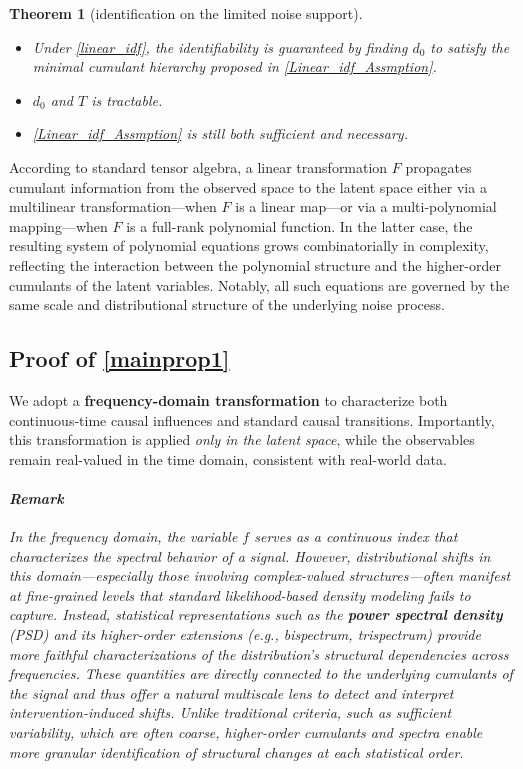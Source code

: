\documentclass[10pt]{article}
\numberwithin{figure}{section}
\newtheorem{theorem}{Theorem}
\begin{document}
\begin{theorem}[identification on the limited noise support]
    \leavevmode
    \begin{itemize}
        \item[(1.)] Under \autoref{linear_idf},  the identifiability is guaranteed by finding $d_0$ to satisfy the minimal cumulant hierarchy proposed in \autoref{Linear_idf_Assmption}.
        \item[(2.)]  $d_0$ and $T$ is tractable.
        \item[(3.)] \autoref{Linear_idf_Assmption} is still both sufficient and necessary.
    \end{itemize}
\end{theorem}
According to standard tensor algebra, a linear transformation \( F \) propagates cumulant information from the observed space to the latent space either via a multilinear transformation—when \( F \) is a linear map—or via a multi-polynomial mapping—when \( F \) is a full-rank polynomial function. In the latter case, the resulting system of polynomial equations grows combinatorially in complexity, reflecting the interaction between the polynomial structure and the higher-order cumulants of the latent variables. Notably, all such equations are governed by the same scale and distributional structure of the underlying noise process. 

\subsection{Proof of \autoref{mainprop1}}

We adopt a \textbf{frequency-domain transformation} to characterize both continuous-time causal influences and standard causal transitions. Importantly, this transformation is applied \emph{only in the latent space}, while the observables remain real-valued in the time domain, consistent with real-world data.

\paragraph{\textit{Remark}}  
\textit{In the frequency domain, the variable \( f \) serves as a continuous index that characterizes the spectral behavior of a signal. However, distributional shifts in this domain—especially those involving complex-valued structures—often manifest at fine-grained levels that standard likelihood-based density modeling fails to capture. Instead, statistical representations such as the \textbf{power spectral density} (PSD) and its higher-order extensions (e.g., bispectrum, trispectrum) provide more faithful characterizations of the distribution's structural dependencies across frequencies. These quantities are directly connected to the underlying cumulants of the signal and thus offer a natural multiscale lens to detect and interpret intervention-induced shifts. Unlike traditional criteria, such as sufficient variability, which are often coarse, higher-order cumulants and spectra enable more granular identification of structural changes at each statistical order.}
\end{document}
